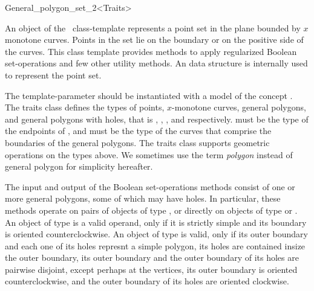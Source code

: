 \ccRefPageBegin

\begin{ccRefClass}{General_polygon_set_2<Traits>}

\ccThreeToTwo
    
\ccDefinition
An object of the \ccClassTemplateName\ class-template represents a
point set in the plane bounded by $x$ monotone curves. Points in the set
lie on the boundary or on the positive side of the curves. This class 
template provides methods to apply regularized Boolean set-operations and 
few other utility methods. An  data structure is 
internally used to represent the point set. 

The  template-parameter should be instantiated with a
model of the concept . The traits class
defines the types of points, $x$-monotone curves, general polygons,
and general polygons with holes, that is ,
, , and 
 respectively.  must 
be the type of the endpoints of , and 
 must be the type of the curves that comprise
the boundaries of the general polygons. The traits class supports geometric 
operations on the types above. We sometimes use the term {\em polygon} instead
of general polygon for simplicity hereafter.

The input and output of the Boolean set-operations methods consist of one 
or more general polygons, some of which may have holes. In particular, 
these methods operate on pairs of objects of type \ccClassTemplateName, or
directly on objects of type  or 
. An object of type 
 is a valid operand, only if it is strictly simple 
and its boundary is oriented counterclockwise. An object of type
 is valid, only if its outer boundary
and each one of its holes represnt a simple polygon, its holes are contained 
insize the outer boundary, its outer boundary and the outer boundary of its 
holes are pairwise disjoint, except perhaps at the vertices, its outer boundary
is oriented counterclockwise, and the outer boundary of its holes are 
oriented clockwise.

\ccTypes
\ccGlue
{}
\ccGlue
{} 


\end{ccRefClass}
